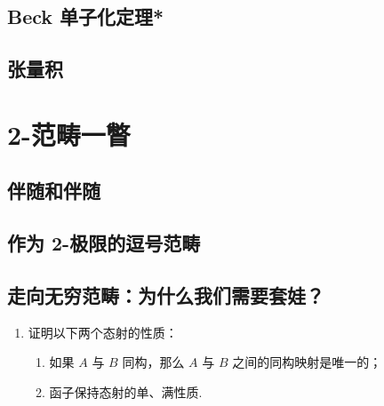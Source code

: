 \subsection{Beck 单子化定理*}

\subsection{张量积}

\section{2-范畴一瞥}

\subsection{伴随和伴随}

\subsection{作为 2-极限的逗号范畴}

\subsection{走向无穷范畴：为什么我们需要套娃？}

\begin{exercise}

    \begin{enumerate}  %
        \item 证明以下两个态射的性质：
        \begin{enumerate}
            \item 如果 $A$ 与 $B$ 同构，那么 $A$ 与 $B$ 之间的同构映射是唯一的；
            \item 函子保持态射的单、满性质.
        \end{enumerate}
    \end{enumerate}
\end{exercise}
